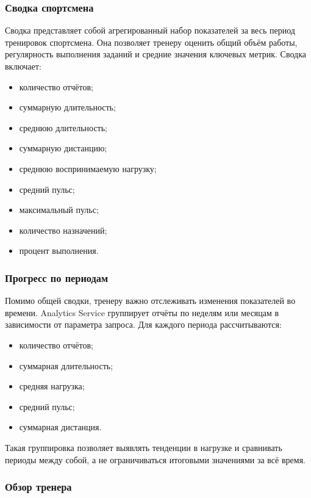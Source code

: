 \subsubsection{Сводка спортсмена}

Сводка представляет собой агрегированный набор показателей за весь период тренировок спортсмена. Она позволяет тренеру оценить общий объём работы, регулярность выполнения заданий и средние значения ключевых метрик. Сводка включает:

\begin{itemize}
\tightlist
\item
  количество отчётов;
\item
  суммарную длительность;
\item
  среднюю длительность;
\item
  суммарную дистанцию;
\item
  среднюю воспринимаемую нагрузку;
\item
  средний пульс;
\item
  максимальный пульс;
\item
  количество назначений;
\item
  процент выполнения.
\end{itemize}

\subsubsection{Прогресс по периодам}

Помимо общей сводки, тренеру важно отслеживать изменения показателей во времени. Analytics Service группирует отчёты по неделям или месяцам в зависимости от параметра запроса. Для каждого периода рассчитываются:

\begin{itemize}
\tightlist
\item
  количество отчётов;
\item
  суммарная длительность;
\item
  средняя нагрузка;
\item
  средний пульс;
\item
  суммарная дистанция.
\end{itemize}

Такая группировка позволяет выявлять тенденции в нагрузке и сравнивать периоды между собой, а не ограничиваться итоговыми значениями за всё время.

\subsubsection{Обзор тренера}

